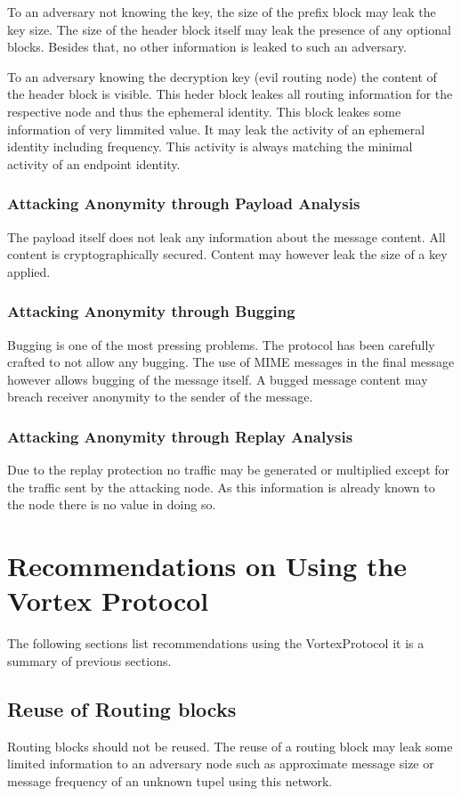 To an adversary not knowing the key, the size of the prefix block may leak the key size. The size of the header block itself may leak the presence of any optional blocks. Besides that, no other information is leaked to such an adversary.

To an adversary knowing the decryption key (evil routing node) the content of the header block is visible. This heder block leakes all routing information for the respective node and thus the ephemeral identity. This block leakes some information of very limmited value. It may leak the activity of an ephemeral identity including frequency. This activity is always matching the minimal activity of an endpoint identity. 

\subsection{Attacking Anonymity through Payload Analysis}
The payload itself does not leak any information about the message content. All content is cryptographically secured. Content may however leak the size of a key applied.

\subsection{Attacking Anonymity through Bugging}
Bugging is one of the most pressing problems. The protocol has been carefully crafted to not allow any bugging. The use of MIME messages in the final message however allows bugging of the message itself. A bugged message content may breach receiver anonymity to the sender of the message.

\subsection{Attacking Anonymity through Replay Analysis}
Due to the replay protection no traffic may be generated or multiplied except for the traffic sent by the attacking node. As this information is already known to the node there is no value in doing so. 

\chapter{Recommendations on Using the Vortex Protocol}
The following sections list recommendations using the VortexProtocol it is a summary of previous sections.

\section{Reuse of Routing blocks\label{sec:reuseRB}}
Routing blocks should not be reused. The reuse of a routing block may leak some limited information to an adversary node such as approximate message size or message frequency of an unknown tupel using this network.

